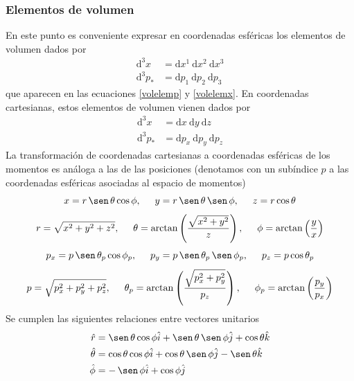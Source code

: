 \documentclass[11pt,twoside,openright,spanish]{report}
\numberwithin{equation}{chapter}
\numberwithin{figure}{chapter}
\numberwithin{table}{chapter}
\renewcommand{\sin}{\operatorname{\sen}}
\begin{document}
\subsubsection{Elementos de volumen}
\noindent
En este punto es conveniente expresar en coordenadas esféricas los elementos de volumen dados por
\begin{eqnarray}
\text{d}^3x&=\text{d}x^1\ \text{d}x^2\ \text{d}x^3\\
\text{d}^3p_*&=\text{d}p_1\ \text{d}p_2\ \text{d}p_3
\end{eqnarray} 
que aparecen en las ecuaciones \eqref{volelemp} y \eqref{volelemx}. En coordenadas cartesianas, estos elementos de volumen vienen dados por
\begin{align}
\text{d}^3x&=\text{d}x\ \text{d}y\ \text{d}z\\
\text{d}^3p_*&=\text{d}p_x\ \text{d}p_y\ \text{d}p_z
\end{align}
La transformación de coordenadas cartesianas a coordenadas esféricas de los momentos es análoga a las de las posiciones (denotamos con un subíndice $p$ a las coordenadas esféricas asociadas al espacio de momentos)
\begin{equation}
x=r\sin\theta\cos\phi,\hspace{0.5cm}y=r\sin\theta\sin\phi,\hspace{0.5cm}z=r\cos\theta
\label{xyxrtp}
\end{equation}
\begin{equation}
r=\sqrt{x^2+y^2+z^2},\hspace{0.5cm}\theta=\arctan\left(\frac{\sqrt{x^2+y^2}}{z}\right),\hspace{0.5cm}\phi=\arctan\left(\frac{y}{x}\right)
\end{equation}
\vspace{0.1cm}
\begin{equation}
p_x=p\sin\theta_p\cos\phi_p,\hspace{0.5cm}p_y=p\sin\theta_p\sin\phi_p,\hspace{0.5cm}p_z=p\cos\theta_p
\end{equation}
\begin{equation}
p=\sqrt{p_x^2+p_y^2+p_z^2},\hspace{0.5cm}\theta_p=\arctan\left(\frac{\sqrt{p_x^2+p_y^2}}{p_z}\right),\hspace{0.5cm}\phi_p=\arctan\left(\frac{p_y}{p_x}\right)
\end{equation}
Se cumplen las siguientes relaciones entre vectores unitarios
\begin{subequations}
\begin{align}
\hat{r}&=\sin\theta\cos\phi\hat{i}+\sin\theta\sin\phi\hat{j}+\cos\theta\hat{k}\\
\hat{\theta}&=\cos\theta\cos\phi\hat{i}+\cos\theta\sin\phi\hat{j}-\sin\theta\hat{k}\\
\hat{\phi}&=-\sin\phi\hat{i}+\cos\phi\hat{j}
\end{align}\label{relacionesvectoresunitarios}
\end{subequations}
\end{document}
